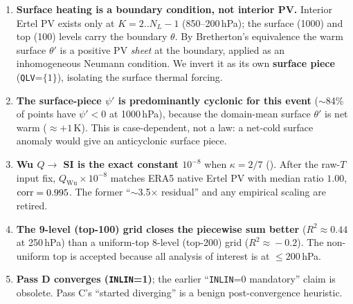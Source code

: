 \begin{enumerate}\setlength\itemsep{3pt}

  \item \textbf{Surface heating is a boundary condition, not interior
        PV.}  Interior Ertel PV exists only at $K{=}2..N_L{-}1$
        (850--200\,hPa); the surface (1000) and top (100) levels carry
        the boundary $\theta$.  By Bretherton's equivalence the warm
        surface $\theta'$ is a positive PV \emph{sheet} at the boundary,
        applied as an inhomogeneous Neumann condition.  We invert it as
        its own \textbf{surface piece} (\texttt{QLV}=$\{1\}$), isolating
        the surface thermal forcing.

  \item \textbf{The surface-piece $\psi'$ is predominantly cyclonic for
        this event} ($\sim$84\% of points have $\psi'<0$ at 1000\,hPa),
        because the domain-mean surface $\theta'$ is net warm
        ($\approx+1$\,K).  This is case-dependent, not a law: a net-cold
        surface anomaly would give an anticyclonic surface piece.

  \item \textbf{Wu $Q\to$ SI is the exact constant $10^{-8}$} when
        $\kappa=2/7$ ().  After the raw-$T$ input
        fix, $Q_{\text{Wu}}\times10^{-8}$ matches ERA5 native Ertel PV
        with median ratio $1.00$, $\operatorname{corr}=0.995$.  The former
        ``$\sim$3.5$\times$ residual'' and any empirical scaling are
        retired.

  \item \textbf{The 9-level (top-100) grid closes the piecewise sum
        better} ($R^2\!\approx\!0.44$ at 250\,hPa) than a uniform-top
        8-level (top-200) grid ($R^2\!\approx\!-0.2$).  The non-uniform
        top is accepted because all analysis of interest is at
        $\le 200$\,hPa.

  \item \textbf{Pass D converges (\texttt{INLIN}=1)}; the earlier
        ``\texttt{INLIN}=0 mandatory'' claim is obsolete.  Pass C's
        ``started diverging'' is a benign post-convergence heuristic.
\end{enumerate}

